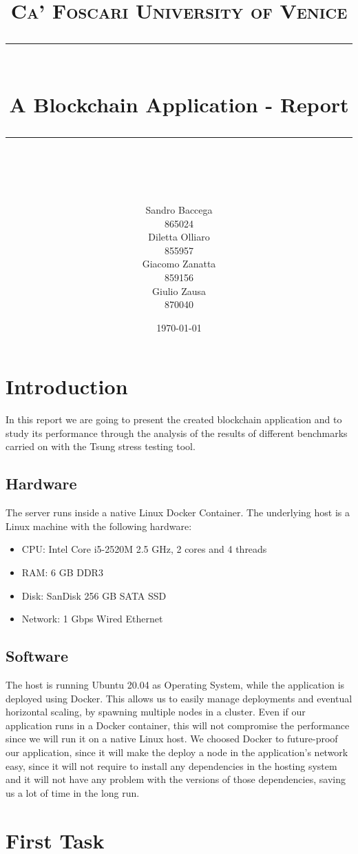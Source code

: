 \documentclass[11pt]{scrartcl} %
\title{	
	\normalfont\normalsize
	\textsc{Ca' Foscari University of Venice}\\ %
	\vspace{25pt} %
	\rule{\linewidth}{0.5pt}\\ %
	\vspace{20pt} %
	{\huge A Blockchain Application - Report}\\ %
	\vspace{12pt} %
	\rule{\linewidth}{2pt}\\ %
	\vspace{12pt} %
}
\author{\hspace{-0.8cm} \parbox{4cm}{\centering
  Sandro Baccega\\ 865024} \parbox{4cm}{\centering
  Diletta Olliaro\\ 855957} \parbox{4cm}{\centering
  Giacomo Zanatta\\ 859156} \parbox{4cm}{\centering Giulio Zausa\\ 870040} } %
\date{\vspace{20pt}\today} %
\begin{document}
\maketitle %



\section{Introduction}

In this report we are going to present the created blockchain application and to study its performance through the analysis of the results of different benchmarks carried on with the Tsung stress testing tool.

\subsection{Hardware}
The server runs inside a native Linux Docker Container. The underlying host is a Linux machine with the following hardware:
\begin{itemize}
\item[\adforn{43}] CPU: Intel Core i5-2520M 2.5 GHz, 2 cores and 4 threads
\item[\adforn{43}] RAM: 6 GB DDR3
\item[\adforn{43}] Disk: SanDisk 256 GB SATA SSD
\item[\adforn{43}] Network: 1 Gbps Wired Ethernet
\end{itemize}

\subsection{Software}

The host is running Ubuntu 20.04 as Operating System, while the application is deployed using Docker. 
This allows us to easily manage deployments and eventual horizontal scaling, by spawning multiple nodes in a cluster. 
Even if our application runs in a Docker container, this will not compromise the performance since we will run it on a native Linux host. 
We choosed Docker to future-proof our application, since it will make the deploy a node in the application's network easy, since it will not require to install any dependencies in the hosting system and it will not have any problem with the versions of those dependencies, saving us a lot of time in the long run.

\section{First Task}
\end{document}
